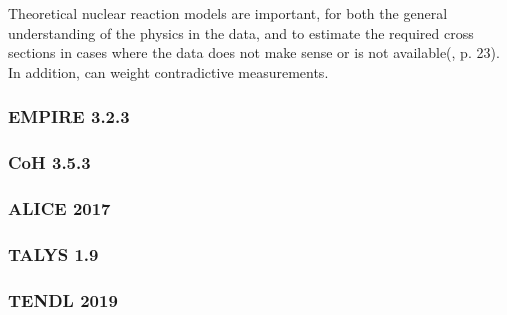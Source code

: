 Theoretical nuclear reaction models are important, for both the general understanding of the physics in the data, and to estimate the required cross sections in cases where the data does not make sense or is not available(\cite{international2012iaea}, p. 23). In addition, can weight contradictive measurements. 

\subsubsection{EMPIRE 3.2.3}
\subsubsection{CoH 3.5.3}
\subsubsection{ALICE 2017}
\subsubsection{TALYS 1.9}
\subsubsection{TENDL 2019}








